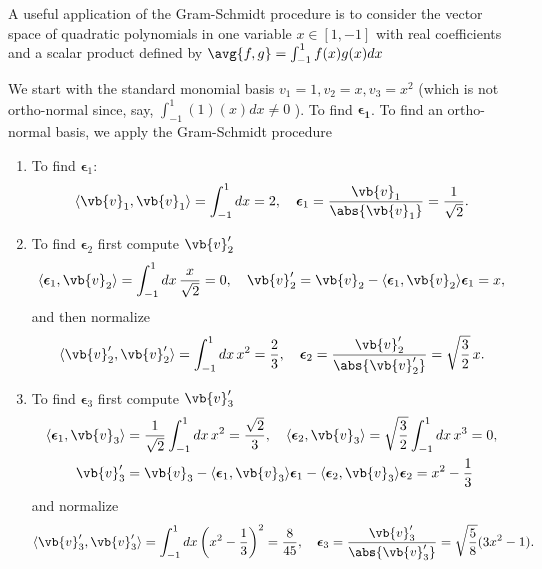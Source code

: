 \documentclass[a4paper,12pt]{report}
\begin{document}
A useful application of the Gram-Schmidt procedure is to consider the vector space of quadratic polynomials in one variable \(x \in [1,-1]\) with real coefficients and a scalar product defined by \(\avg{f,g} = \int_{-1}^{1} f(x)g(x)dx \)

We start with the standard monomial basis \(v_1 = 1, v_2 = x, v_3 =x^2\)  (which is not ortho-normal since, say, \(\int_{-1}^{1} (1)(x)dx \neq 0  \) ). To find \(\boldsymbol{\epsilon _{1} }\). To find an ortho-normal basis, we apply the Gram-Schmidt procedure

\begin{enumerate}
    \item To find \(\boldsymbol{\epsilon}_1\):
    \begin{equation}
    \langle \vb{v}_1, \vb{v}_1 \rangle = \int_{-1}^{1} dx = 2, \quad \boldsymbol{\epsilon}_1 = \frac{\vb{v}_1}{\abs{\vb{v}_1}} = \frac{1}{\sqrt{2}}.
    \end{equation}
    \item To find \(\boldsymbol{\epsilon}_2\) first compute \(\vb{v}'_2\)
    \begin{equation}
    \langle \boldsymbol{\epsilon}_1, \vb{v}_2 \rangle = \int_{-1}^{1} dx \, \frac{x}{\sqrt{2}} = 0, \quad \vb{v}'_2 = \vb{v}_2 - \langle \boldsymbol{\epsilon}_1, \vb{v}_2 \rangle \boldsymbol{\epsilon}_1 = x,
    \end{equation}
    and then normalize
    \begin{equation}
    \langle \vb{v}'_2, \vb{v}'_2 \rangle = \int_{-1}^{1} dx \, x^2 = \frac{2}{3}, \quad \boldsymbol{\epsilon}_2 = \frac{\vb{v}'_2}{\abs{\vb{v}'_2}} = \sqrt{\frac{3}{2}} \, x.
    \end{equation}
    \item To find \(\boldsymbol{\epsilon}_3\) first compute \(\vb{v}'_3\)
    \begin{equation}
    \begin{aligned}
    \langle \boldsymbol{\epsilon}_1, \vb{v}_3 \rangle &= \frac{1}{\sqrt{2}} \int_{-1}^{1} dx \, x^2 = \frac{\sqrt{2}}{3}, \quad \langle \boldsymbol{\epsilon}_2, \vb{v}_3 \rangle = \sqrt{\frac{3}{2}} \int_{-1}^{1} dx \, x^3 = 0, \\ \quad \vb{v}'_3 &= \vb{v}_3 - \langle \boldsymbol{\epsilon}_1, \vb{v}_3 \rangle \boldsymbol{\epsilon}_1 - \langle \boldsymbol{\epsilon}_2, \vb{v}_3 \rangle \boldsymbol{\epsilon}_2 = x^2 - \frac{1}{3}
    \end{aligned}
    \end{equation}
    and normalize
    \begin{equation}
    \langle \vb{v}'_3, \vb{v}'_3 \rangle = \int_{-1}^{1} dx \left( x^2 - \frac{1}{3} \right)^2 = \frac{8}{45}, \quad \boldsymbol{\epsilon}_3 = \frac{\vb{v}'_3}{\abs{\vb{v}'_3}} = \sqrt{\frac{5}{8}} (3x^2 - 1).
    \end{equation}
\end{enumerate}
\end{document}
